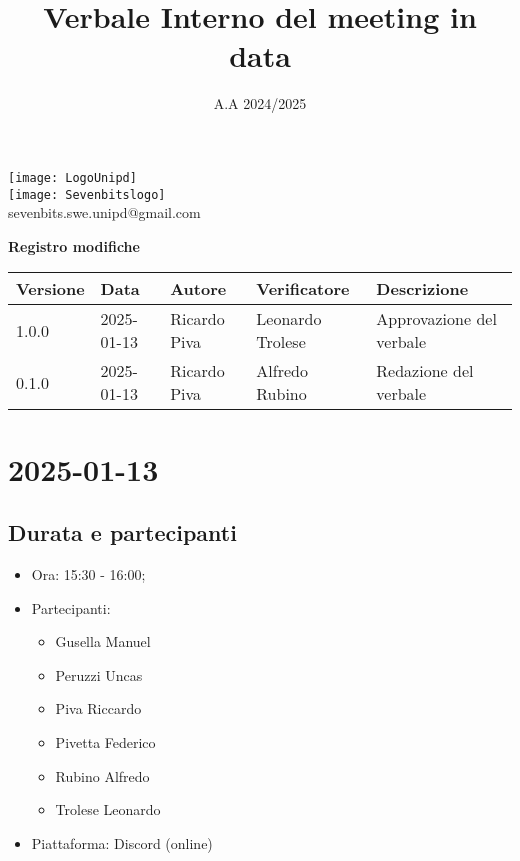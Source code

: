 \documentclass[10pt]{article}
\title{Verbale Interno del meeting in data}
\date{A.A 2024/2025}
\begin{document}
\maketitle
\begin{center}
\texttt{[image: LogoUnipd]}\\
\texttt{[image: Sevenbitslogo]}\\
sevenbits.swe.unipd@gmail.com\\
\vspace{2mm}

\textbf{Registro modifiche}\\
\vspace{2mm}
\begin{tabularx}{\textwidth}{|l|l|l|l|X|}
\hline
\textbf{Versione} & \textbf{Data} & \textbf{Autore} & \textbf{Verificatore} & \textbf{Descrizione} \\
\hline
1.0.0 & 2025-01-13 & Ricardo Piva & Leonardo Trolese & Approvazione del verbale \\
\hline
0.1.0 & 2025-01-13 & Ricardo Piva & Alfredo Rubino & Redazione del verbale \\
\hline
\end{tabularx}
\end{center}

\newpage
\tableofcontents
\newpage
\section{2025-01-13}
\subsection{Durata e partecipanti}
\begin{itemize}
\item Ora: 15:30 - 16:00;
\item Partecipanti: 	
	\begin{itemize}
		\item Gusella Manuel
		\item Peruzzi Uncas
		\item Piva Riccardo
		\item Pivetta Federico
		\item Rubino Alfredo
		\item Trolese Leonardo
	\end{itemize}
\item Piattaforma: Discord (online)
\end{itemize}
\end{document}
